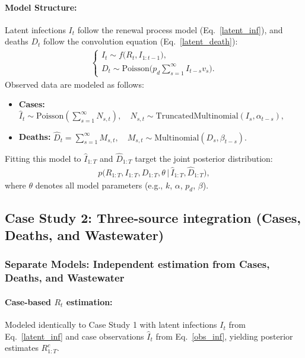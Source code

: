 \documentclass{article}
\begin{document}
\paragraph{Model Structure:}
Latent infections $I_{t}$ follow the renewal process model (Eq.~\eqref{latent_inf}), and deaths $D_t$ follow the convolution equation (Eq.~\eqref{latent_death}):
\begin{align}
\begin{cases}
I_t \sim f\big(R_t, I_{1:t-1}\big),\\[4pt]
D_t \sim \mathrm{Poisson}\!\Big( p_d \sum_{s=1}^\infty I_{t-s} v_s \Big).
\end{cases}
\end{align}
Observed data are modeled as follows:
\begin{itemize}
    \item \textbf{Cases:} $\widehat{I}_t \sim \mathrm{Poisson}\left( \sum_{s=1}^\infty N_{s,t} \right), \quad N_{s,t} \sim \mathrm{TruncatedMultinomial}(I_s, \alpha_{t-s}),$
    \item \textbf{Deaths:} $\widehat{D}_t = \sum_{s=1}^\infty M_{s,t}, \quad M_{s,t} \sim \mathrm{Multinomial}(D_s, \beta_{t-s}).$
\end{itemize}
Fitting this model to $\widehat{I}_{1:T}$ and $\widehat{D}_{1:T}$ target the joint posterior distribution:
\begin{align}
p\big(R_{1:T}, I_{1:T}, D_{1:T}, \theta \,\big|\, \widehat{I}_{1:T}, \widehat{D}_{1:T}\big),
\end{align}
where $\theta$ denotes all model parameters (e.g., $k$, $\alpha$, $p_d$, $\beta$).


\subsection{Case Study 2: Three-source integration (Cases, Deaths, and Wastewater)}

\subsubsection{Separate Models: Independent estimation from Cases, Deaths, and Wastewater}

\paragraph{Case-based $R_t$ estimation:}  
Modeled identically to Case Study 1 with latent infections $I_t$ from Eq.~\eqref{latent_inf} and case observations $\widehat{I}_t$ from  Eq.~\eqref{obs_inf}, yielding posterior estimates $R_{1:T}^c$.
\end{document}
